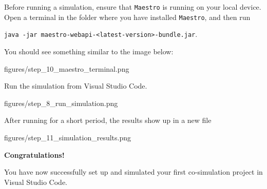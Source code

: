 \documentclass[11pt,a4paper]{../tutorial}
\newcommand{\maestro}{\texttt{Maestro}\xspace}
\begin{document}
\begin{instructions}

\item Before running a simulation, ensure that \maestro is running on your local device. Open a terminal in the folder where you have installed \maestro, and then run 

\texttt{java -jar maestro-webapi-<latest-version>-bundle.jar}. 

You should see something similar to the image below:

\begin{annotation}[width=0.9\linewidth]{figures/step_10_maestro_terminal.png}
	\end{annotation}

\item Run the simulation from Visual Studio Code.


\begin{annotation}[width=0.9\linewidth]{figures/step_8_run_simulation.png}
	\end{annotation}

\clearpage
\item After running for a short period, the results show up in a new file 


	\begin{annotation}[width=0.9\linewidth]{figures/step_11_simulation_results.png}
		\end{annotation}

		\bigskip
    \bigskip
    {\large\bfseries Congratulations!}

    You have now successfully set up and simulated your first co-simulation project in Visual Studio Code.
\end{instructions}
\end{document}
